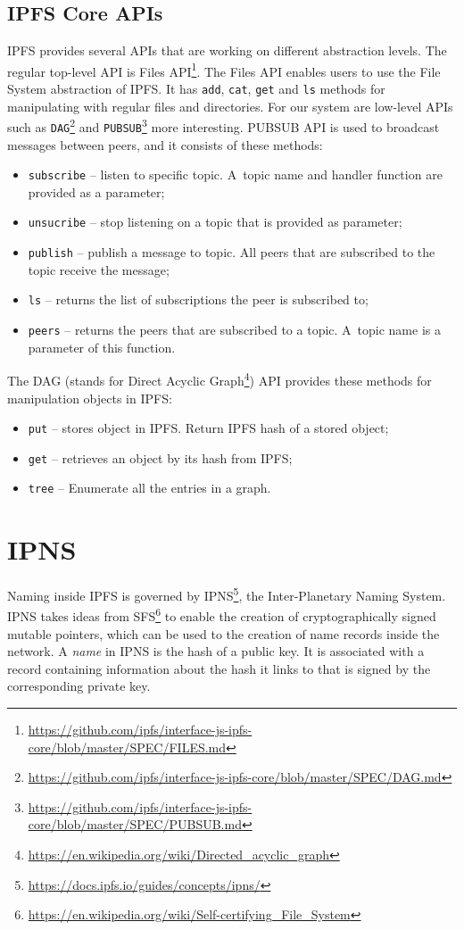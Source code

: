 \subsection{IPFS Core APIs}
\label{ipfsApis}
IPFS provides several APIs that are working on different abstraction levels. The regular top-level API is Files API\footnote{\url{https://github.com/ipfs/interface-js-ipfs-core/blob/master/SPEC/FILES.md}}. The Files API enables users to use the File System abstraction of IPFS. It has \texttt{add}, \texttt{cat}, \texttt{get} and \texttt{ls} methods for manipulating with regular files and directories. For our system are low-level APIs such as \texttt{DAG}\footnote{\url{https://github.com/ipfs/interface-js-ipfs-core/blob/master/SPEC/DAG.md}} and \texttt{PUBSUB}\footnote{\url{https://github.com/ipfs/interface-js-ipfs-core/blob/master/SPEC/PUBSUB.md}} more interesting. PUBSUB API is used to broadcast messages between peers, and it consists of these methods:
\begin{itemize}
    \item \texttt{subscribe} -- listen to specific topic. A~topic name and handler function are provided as a parameter;
    \item \texttt{unsucribe} -- stop listening on a topic that is provided as parameter;
    \item \texttt{publish} -- publish a message to topic. All peers that are subscribed to the topic receive the message;
    \item \texttt{ls} -- returns the list of subscriptions the peer is subscribed to;
    \item \texttt{peers} -- returns the peers that are subscribed to a topic. A~topic name is a parameter of this function.
\end{itemize}
The DAG (stands for Direct Acyclic Graph\footnote{\url{https://en.wikipedia.org/wiki/Directed_acyclic_graph}}) API provides these methods for manipulation objects in IPFS:
\begin{itemize}
    \item \texttt{put} -- stores object in IPFS. Return IPFS hash of a stored object;
    \item \texttt{get} -- retrieves an object by its hash from IPFS;
    \item \texttt{tree} -- Enumerate all the entries in a graph.
\end{itemize}

\section{IPNS}
Naming inside IPFS is governed by IPNS\footnote{\url{https://docs.ipfs.io/guides/concepts/ipns/}}, the Inter-Planetary Naming System. IPNS takes ideas from SFS\footnote{\url{https://en.wikipedia.org/wiki/Self-certifying_File_System}} to enable the creation of cryptographically signed mutable pointers, which can be used to the creation of name records inside the network. A \textit{name} in IPNS is the hash of a public key. It is associated with a record containing information about the hash it links to that is signed by the corresponding private key.

